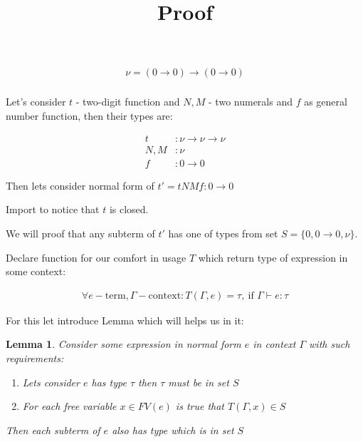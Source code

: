 \documentclass[11pt]{article}
\title{ Proof }
\newtheorem{lemma}[theorem]{Lemma}
\newcommand{\gt}{\tau}
\newcommand{\too}{\rightarrow}
\begin{document}
\maketitle	

\section*{}

\begin{align*}
    \nu = (0 \too 0) \too (0 \too 0) \\
\end{align*}

Let's consider \(t\) - two-digit function and \(N, M\) - two numerals and \(f\) as general number function, then their types are:

\begin{align*}
    t &: \nu \too \nu \too \nu \\
    N, M &: \nu \\
    f &: 0 \too 0
\end{align*}

Then lets consider normal form of \(t' = t N M f : 0 \too 0\)

Import to notice that \(t\) is closed.

We will proof that any subterm of \(t'\) has one of types from set \(S = \{0, 0 \too 0, \nu\}\).

Declare function for our comfort in usage \(T\) which return type of expression in some context: 

\begin{align*}
    \forall e - \text{term}, \Gamma - \text{context} : T(\Gamma, e) = \gt,\ \text{if \(\Gamma \vdash e:\gt\)}
\end{align*}

For this let introduce Lemma which will helps us in it:

\begin{lemma}\label{l1}
    Consider some expression in normal form \(e\) in context \(\Gamma\) with such requirements:
    \begin{enumerate}
        \item Lets consider \(e\) has type \(\tau\) then \(\tau\) must be in set \(S\)
        \item For each free variable \(x \in FV(e)\) is true that \(T(\Gamma, x) \in S\)
    \end{enumerate}
    Then each subterm of \(e\) also has type which is in set \(S\)
\end{lemma}
\end{document}
